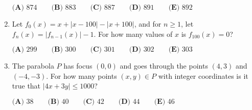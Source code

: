 \documentclass{article}
\begin{document}
\begin{enumerate}[label=\arabic*., itemsep=0.5em]
\(\textbf{(A) }874\qquad
\textbf{(B) }883\qquad
\textbf{(C) }887\qquad
\textbf{(D) }891\qquad
\textbf{(E) }892\qquad\)\par \vspace{0.5em}\item Let \(f_0(x)=x+|x-100|-|x+100|\), and for \(n\geq 1\), let \(f_n(x)=|f_{n-1}(x)|-1\).  For how many values of \(x\) is \(f_{100}(x)=0\)?

\(\textbf{(A) }299\qquad
\textbf{(B) }300\qquad
\textbf{(C) }301\qquad
\textbf{(D) }302\qquad
\textbf{(E) }303\qquad\)\par \vspace{0.5em}\item The parabola \(P\) has focus \((0,0)\) and goes through the points \((4,3)\) and \((-4,-3)\).  For how many points \((x,y)\in P\) with integer coordinates is it true that \(|4x+3y|\leq 1000\)?

\(\textbf{(A) }38\qquad
\textbf{(B) }40\qquad
\textbf{(C) }42\qquad
\textbf{(D) }44\qquad
\textbf{(E) }46\qquad\)\par \vspace{0.5em}\end{enumerate}
\end{document}
